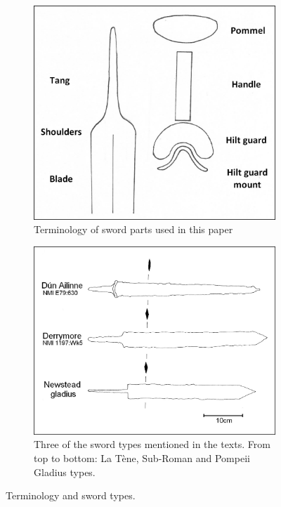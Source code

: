 
\begin{figure}[!tb]
\begin{subfigure}[b]{0.45\textwidth}
\includegraphics[width=\linewidth]{figures/Hughes_Sword_fig02.jpg} 
\caption{Terminology of sword parts used in this paper}
\label{hughes_fig2}
\end{subfigure}
\hfill
\begin{subfigure}[b]{0.45\textwidth}
\includegraphics[width=\linewidth]{figures/Hughes_Sword_fig04.jpg} 
\caption{Three of the sword types mentioned in the texts. From top to bottom: La Tène, Sub-Roman and Pompeii Gladius types.}
\label{hughes_fig4}
\end{subfigure}
\caption{Terminology and sword types.}
\end{figure}

